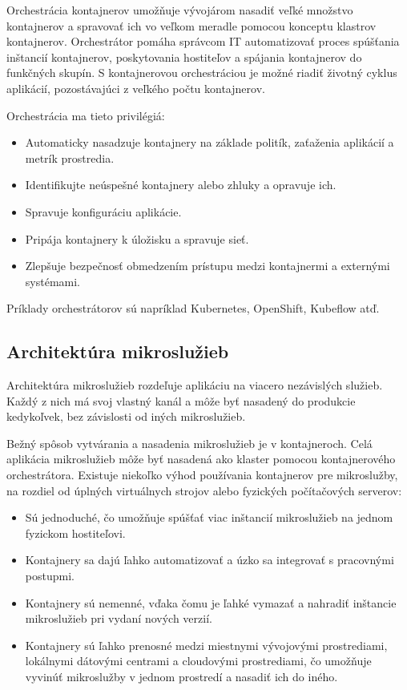 Orchestrácia kontajnerov umožňuje vývojárom nasadiť veľké množstvo kontajnerov a spravovať ich vo veľkom meradle pomocou konceptu klastrov kontajnerov. Orchestrátor pomáha správcom IT automatizovať proces spúšťania inštancií kontajnerov, poskytovania hostiteľov a spájania kontajnerov do funkčných skupín. S kontajnerovou orchestráciou je možné riadiť životný cyklus aplikácií, pozostávajúci z veľkého počtu kontajnerov.

Orchestrácia ma tieto privilégiá:

\begin{itemize}
	\item Automaticky nasadzuje kontajnery na základe politík, zaťaženia aplikácií a metrík prostredia.
	\item Identifikujte neúspešné kontajnery alebo zhluky a opravuje ich.
	\item Spravuje konfiguráciu aplikácie.
	\item Pripája kontajnery k úložisku a spravuje sieť.
	\item Zlepšuje bezpečnosť obmedzením prístupu medzi kontajnermi a externými systémami.
\end{itemize}

Príklady orchestrátorov sú napríklad Kubernetes, OpenShift, Kubeflow atď.

\subsection{Architektúra mikroslužieb}

Architektúra mikroslužieb rozdeľuje aplikáciu na viacero nezávislých služieb. Každý z nich má svoj vlastný kanál a môže byť nasadený do produkcie kedykoľvek, bez závislosti od iných mikroslužieb.

Bežný spôsob vytvárania a nasadenia mikroslužieb je v kontajneroch. Celá aplikácia mikroslužieb môže byť nasadená ako klaster pomocou kontajnerového orchestrátora. Existuje niekoľko výhod používania kontajnerov pre mikroslužby, na rozdiel od úplných virtuálnych strojov alebo fyzických počítačových serverov:

\begin{itemize}
\item Sú jednoduché, čo umožňuje spúšťať viac inštancií mikroslužieb na jednom fyzickom hostiteľovi.
\item Kontajnery sa dajú ľahko automatizovať a úzko sa integrovať s pracovnými postupmi.
\item Kontajnery sú nemenné, vďaka čomu je ľahké vymazať a nahradiť inštancie mikroslužieb pri vydaní nových verzií.
\item Kontajnery sú ľahko prenosné medzi miestnymi vývojovými prostrediami, lokálnymi dátovými centrami a cloudovými prostrediami, čo umožňuje vyvinúť mikroslužby v jednom prostredí a nasadiť ich do iného.
\end{itemize}

